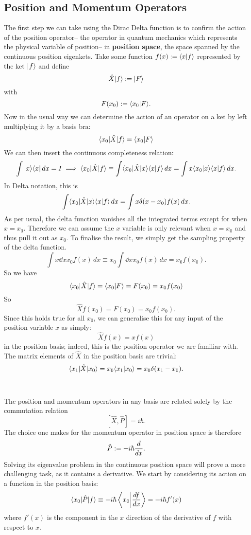 \subsection{Position and Momentum Operators}
The first step we can take using the Dirac Delta function is to confirm the action of the position operator-- the operator in quantum mechanics which represents the physical variable of position-- in \textbf{position space}, the space spanned by the continuous position eigenkets. Take some function $f(x):=\langle x|f\rangle$ represented by the ket $|f\rangle$ and define
$$
\hat{X}|f\rangle:=|F\rangle
$$
with 
$$
F(x_{0}):=\langle x_{0}|F\rangle.
$$
Now in the usual way we can determine the action of an operator on a ket by left multiplying it by a basis bra:
$$
\langle x_{0}|\hat{X}|f\rangle=\langle x_{0}|F\rangle
$$
We can then insert the continuous completeness relation:
$$
\int|x\rangle\langle x|\,dx=I\implies\langle x_{0}|\hat{X}|f\rangle\equiv \int\langle x_{0}|\hat{X}|x\rangle\langle x|f\rangle\,dx=\int x\langle x_{0}|x\rangle\langle x|f\rangle\,dx.
$$
In Delta notation, this is 
$$
\int\langle x_{0}|\hat{X}|x\rangle\langle x|f\rangle\,dx=\int x\delta(x-x_{0})f(x)\,dx.
$$
As per usual, the delta function vanishes all the integrated terms except for when $x=x_{0}$. Therefore we can assume the $x$ variable is only relevant when $x=x_{0}$ and thus pull it out as $x_{0}$. To finalise the result, we simply get the sampling property of the delta function.
$$
\int x\dd{x}{x_{0}}f(x)\,dx\equiv x_{0}\int\dd{x}{x_{0}}f(x)\,dx = x_{0}f(x_{0}).
$$
So we have $$
\langle x_{0}|\hat{X}|f\rangle=\langle x_{0}|F\rangle
=F(x_{0})=x_{0}f(x_{0})
$$
So
$$
\hat{X}f(x_{0})=F(x_{0})=x_{0}f(x_{0}).
$$
Since this holds true for all $x_{0}$, we can generalise this for any input of the position variable $x$ as simply:
$$
\hat{X}f(x)=xf(x)
$$
in the position basis; indeed, this is the position operator we are familiar with. The matrix elements of $\hat{X}$ in the position basis are trivial:
$$
\langle x_{1}|\hat{X}|x_{0}\rangle=x_{0}\langle x_{1}|x_{0}\rangle=x_{0}\delta(x_{1}-x_{0}).
$$
\\\\
The position and momentum operators in any basis are related solely by the commutation relation
$$
[\hat{X},\hat{P}]=i\hbar.
$$
The choice one makes for the momentum operator in position space is therefore 
$$
\hat{P}:=-i\hbar\frac{d}{d x}.
$$
Solving its eigenvalue problem in the continuous position space will prove a more challenging task, as it contains a derivative. We start by considering its action on a function in the position basis:
$$
\langle x_{0}|\hat{P}|f\rangle\equiv -i\hbar\left\langle x_{0}\middle|\frac{df}{d x}\right\rangle=-i\hbar f'(x)
$$
where $f'(x)$ is the component in the $x$ direction of the derivative of $f$ with respect to $x$. 
